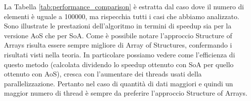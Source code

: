 \documentclass[10pt,twocolumn,letterpaper]{article}
\begin{document}
\begin{table}[ht]
\centering
\caption{Confronto delle prestazioni fra AoS e SoA (N=100000)}
\label{tab:performance_comparison}
\end{table}
La Tabella \ref{tab:performance_comparison} è estratta dal caso dove il numero di elementi è uguale a 100000, ma rispecchia tutti i casi che abbiamo analizzato. Sono illustrate le prestazioni dell'algoritmo in termini di speedup sia per la versione AoS che per SoA. Come è possibile notare l'approccio Structure of Arrays risulta essere sempre migliore di Array of Structures, confermando i risultati visti nella teoria. In particolare possiamo vedere come l'efficienza di questo metodo (calcolata dividendo lo speedup ottenuto con SoA per quello ottenuto con AoS), cresca con l'aumentare dei threads usati della parallelizzazione. Pertanto nel caso di quantità di dati maggiori e quindi un maggior numero di thread è sempre da preferire l'approccio Structure of Arrays.


\begin{table}[ht]
\centering
\caption{Confronto delle prestazioni fra AoS e SoA (K=50)}
\label{tab:performance_comparison2}
\end{table}
\end{document}
